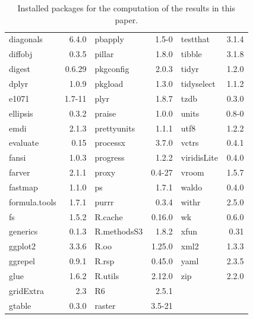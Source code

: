 \begin{table}[h]
\begin{tabular}{lr|lr|lr}
			diagonals & 6.4.0 & pbapply & 1.5-0 & testthat & 3.1.4 \\
			diffobj & 0.3.5 & pillar & 1.8.0 & tibble & 3.1.8 \\
			digest & 0.6.29 & pkgconfig & 2.0.3 & tidyr & 1.2.0 \\
			dplyr & 1.0.9 & pkgload & 1.3.0 & tidyselect & 1.1.2 \\
			e1071 & 1.7-11 & plyr & 1.8.7 & tzdb & 0.3.0 \\
			ellipsis & 0.3.2 & praise & 1.0.0 & units & 0.8-0 \\
			emdi & 2.1.3 & prettyunits & 1.1.1 & utf8 & 1.2.2 \\
			evaluate & 0.15 & processx & 3.7.0 & vctrs & 0.4.1 \\
			fansi & 1.0.3 & progress & 1.2.2 & viridisLite & 0.4.0 \\
			farver & 2.1.1 & proxy & 0.4-27 & vroom & 1.5.7 \\
			fastmap & 1.1.0 & ps & 1.7.1 & waldo & 0.4.0 \\
			formula.tools & 1.7.1 & purrr & 0.3.4 & withr & 2.5.0 \\
			fs & 1.5.2 & R.cache & 0.16.0 & wk & 0.6.0 \\
			generics & 0.1.3 & R.methodsS3 & 1.8.2 & xfun & 0.31 \\
			ggplot2 & 3.3.6 & R.oo & 1.25.0 & xml2 & 1.3.3 \\
			ggrepel & 0.9.1 & R.rsp & 0.45.0 & yaml & 2.3.5 \\
			glue & 1.6.2 & R.utils & 2.12.0 & zip & 2.2.0 \\
			gridExtra & 2.3 & R6 & 2.5.1 &   &   \\
			gtable & 0.3.0 & raster & 3.5-21 &  &  \\
			\bottomrule
		\end{tabular}
	\caption{Installed packages for the computation of the results in this paper.}\label{tab:Rpackages}
\end{table}

\address{Sylvia Harmening\\
  Institute for Statistics and Econometrics, School of Business \& Economics, Freie Universit\"at Berlin\\
  Garystr.~21, 14195 Berlin\\
  Germany\\
  }

\address{Ann-Kristin Kreutzmann\\
	Institute for Statistics and Econometrics, School of Business \& Economics, Freie Universit\"at Berlin\\
	Garystr.~21, 14195 Berlin\\
	Germany\\
	}

